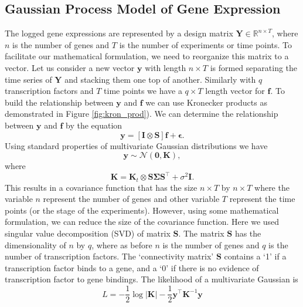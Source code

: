 \subsection{Gaussian Process Model of Gene Expression}
The logged gene expressions are represented by a design matrix $\textbf{Y} \in \mathbb{R}^{ n \times T}$, where $n$ is the number of genes and $T$ is the number of experiments or time points. To facilitate our mathematical formulation, we need to reorganize this matrix to a vector. Let us consider a new vector $\mathbf{y}$ with length $n\times T$ is formed separating the time series of $\mathbf{Y}$ and stacking them one top of another. Similarly with $q$ transcription factors and $T$ time points we have  a $q \times T$ length vector for $\mathbf{f}$. To build the relationship between  $\mathbf{y}$ and $\mathbf{f}$ we can use Kronecker products as demonstrated in Figure \ref{fig:kron_prod}). We can determine the relationship between $\mathbf{y}$ and $\mathbf{f}$ by the equation
\begin{equation} \label{eq:rel_y_f}
\mathbf{y} = \left[\mathbf{I}\otimes \mathbf{S}\right]\mathbf{f}+\boldsymbol{\epsilon}.
\end{equation} 
Using standard properties of multivariate Gaussian distributions we have
\begin{equation} \label{eq:mGPd}
\mathbf{y} \sim \mathcal{N}(\mathbf{0}, \mathbf{K}),
\end{equation}
where
\begin{equation} \label{eq:K}
\mathbf{K} = \mathbf{K}_t \otimes \mathbf{S} \boldsymbol{\Sigma} \mathbf{S}^\top + \sigma^2 \mathbf{I}.
\end{equation}
This results in a covariance function that has the size $n\times T$ by $n\times T$ where the variable $n$ represent the number of genes and other variable $T$ represent the time points (or the stage of the experiments). However, using some mathematical formulation, we can reduce the size of the covariance function. Here we used singular value decomposition (SVD) of matrix $\mathbf{S}$. The matrix $\mathbf{S}$ has the dimensionality of $n$ by $q$, where as before $n$ is the number of genes and $q$ is the number of transcription factors. The \lq connectivity matrix\rq{ }$\mathbf{S}$ contains a \lq 1\rq{ }if a transcription factor binds to a gene, and a \lq 0\rq{ }if there is no evidence of transcription factor to gene bindings. The likelihood of a multivariate Gaussian is
\begin{equation} \label{eq:Likelihood}
L = -\frac{1}{2} \log |\mathbf{K}| - \frac{1}{2} \mathbf{y}^\top \mathbf{K}^{-1} \mathbf{y}
\end{equation}

